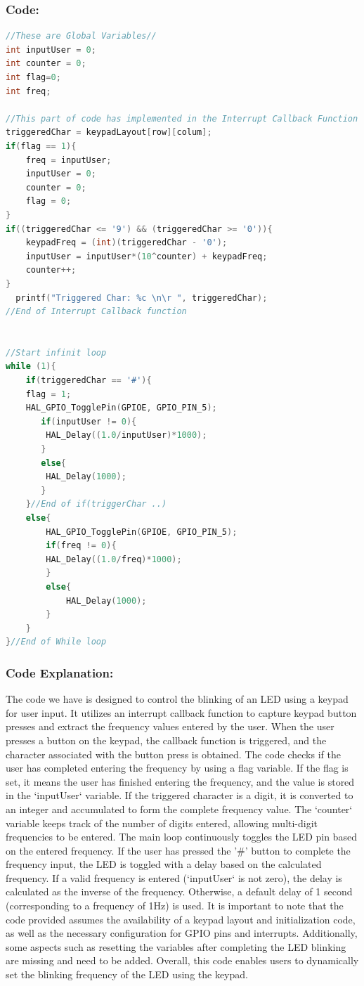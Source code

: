 \documentclass[english]{article}
\begin{document}
\subsubsection{Code:}
\begin{lstlisting}[language=C, caption={C code using listings}, label={lst:flagCode} ]
//These are Global Variables//
int inputUser = 0;
int counter = 0;
int flag=0;
int freq;

//This part of code has implemented in the Interrupt Callback Function
triggeredChar = keypadLayout[row][colum];
if(flag == 1){
    freq = inputUser;
    inputUser = 0;
    counter = 0;
    flag = 0;
}
if((triggeredChar <= '9') && (triggeredChar >= '0')){
    keypadFreq = (int)(triggeredChar - '0');
    inputUser = inputUser*(10^counter) + keypadFreq;
    counter++;
}
  printf("Triggered Char: %c \n\r ", triggeredChar);
//End of Interrupt Callback function


//Start infinit loop
while (1){
    if(triggeredChar == '#'){
	flag = 1;
	HAL_GPIO_TogglePin(GPIOE, GPIO_PIN_5);
	   if(inputUser != 0){
		HAL_Delay((1.0/inputUser)*1000);
	   }
	   else{
		HAL_Delay(1000);
	   }
    }//End of if(triggerChar ..)
    else{
        HAL_GPIO_TogglePin(GPIOE, GPIO_PIN_5);
        if(freq != 0){
        HAL_Delay((1.0/freq)*1000);
        }
        else{
            HAL_Delay(1000);
        }
    }
}//End of While loop
\end{lstlisting}
\subsubsection{Code Explanation:}
The code we have is designed to control the blinking of an LED using 
a keypad for user input. It utilizes an interrupt callback function to 
capture keypad button presses and extract the frequency values entered by the user.
When the user presses a button on the keypad, the callback function is 
triggered, and the character associated with the button press is obtained.
 The code checks if the user has completed entering the frequency by using a 
 flag variable. If the flag is set, it means the user has finished entering 
 the frequency, and the value is stored in the `inputUser` variable.
If the triggered character is a digit, it is converted to an integer and 
accumulated to form the complete frequency value. The `counter` variable keeps
 track of the number of digits entered, allowing multi-digit frequencies to be entered.
The main loop continuously toggles the LED pin based on the entered frequency.
 If the user has pressed the '\#' button to complete the frequency input, 
 the LED is toggled with a delay based on the calculated frequency. 
 If a valid frequency is entered (`inputUser` is not zero), the delay is
  calculated as the inverse of the frequency. Otherwise, a default delay of 
  1 second (corresponding to a frequency of 1Hz) is used.
It is important to note that the code provided assumes the availability of a
keypad layout and initialization code, as well as the necessary configuration 
for GPIO pins and interrupts. Additionally, some aspects such as resetting 
the variables after completing the LED blinking are missing and need to be added.
Overall, this code enables users to dynamically set the blinking frequency of
 the LED using the keypad.
\newpage
\end{document}

